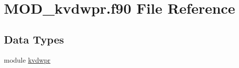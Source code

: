 \hypertarget{MOD__kvdwpr_8f90}{\section{M\-O\-D\-\_\-kvdwpr.\-f90 File Reference}
\label{MOD__kvdwpr_8f90}
}
\subsection*{Data Types}
\begin{DoxyCompactItemize}
\item 
module \hyperlink{classkvdwpr}{kvdwpr}
\end{DoxyCompactItemize}
